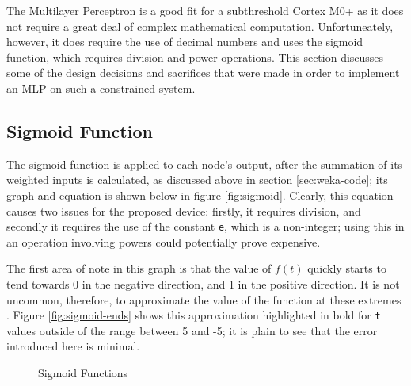 
The Multilayer Perceptron is a good fit for a subthreshold Cortex M0+ as it does not require a great deal of complex mathematical computation. Unfortuneately, however, it does require the use of decimal numbers and uses the sigmoid function, which requires division and power operations. This section discusses some of the design decisions and sacrifices that were made in order to implement an MLP on such a constrained system.

\subsection{Sigmoid Function}
The sigmoid function is applied to each node's output, after the summation of its weighted inputs is calculated, as discussed above in section \ref{sec:weka-code}; its graph and equation is shown below in figure \ref{fig:sigmoid}. Clearly, this equation causes two issues for the proposed device: firstly, it requires division, and secondly it requires the use of the constant \verb|e|, which is a non-integer; using this in an operation involving powers could potentially prove expensive.

The first area of note in this graph is that the value of $f(t)$ quickly starts to tend towards 0 in the negative direction, and 1 in the positive direction. It is not uncommon, therefore, to approximate the value of the function at these extremes \cite{sigmoid_approx}. Figure \ref{fig:sigmoid-ends} shows this approximation highlighted in bold for \verb|t| values outside of the range between 5 and -5; it is plain to see that the error introduced here is minimal.

\begin{figure}[!h]
    \centering
    \caption{Sigmoid Functions \label{fig:sigmoid-options}}
\end{figure}

